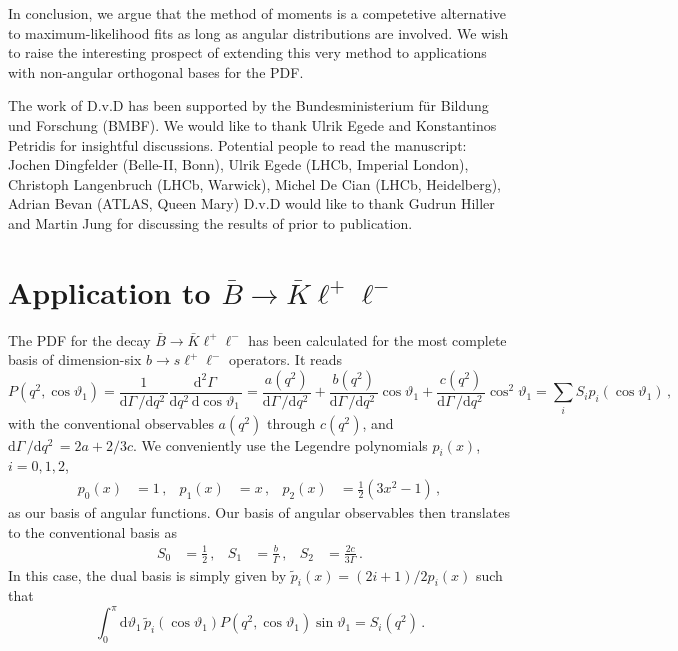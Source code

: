 \documentclass[aps,prd,reprint,nofootinbib,preprintnumbers]{revtex4}
\newcommand{\dual}[1]{\tilde{#1}}
\newcommand{\rmdx}[1]{\mbox{d} #1 \,} %
\renewcommand{\theta}{\vartheta}
\newcommand{\danny}[1]{{\color{purple}#1}}
\begin{document}
In conclusion, we argue that the method of moments is a competetive alternative to maximum-likelihood fits as long
as angular distributions are involved. We wish to raise the interesting prospect of extending this very method to
applications with non-angular orthogonal bases for the PDF.


\acknowledgments

The work of D.v.D has been supported by the Bundesministerium f\"ur Bildung und Forschung (BMBF).
We would like to thank Ulrik Egede and Konstantinos Petridis for insightful discussions.
\danny{Potential people to read the manuscript: Jochen Dingfelder (Belle-II, Bonn), Ulrik Egede (LHCb, Imperial London), Christoph Langenbruch (LHCb, Warwick), Michel De Cian (LHCb, Heidelberg), Adrian Bevan (ATLAS, Queen Mary)  }
D.v.D would like to thank Gudrun Hiller and Martin Jung for discussing the results of \cite{Das:2014sra} prior to publication.

\appendix

\section{Application to $\bar{B}\to\bar{K}\ell^+\ell^-$}
\label{app:btokll}

The PDF for the decay $\bar{B}\to\bar{K}\ell^+\ell^-$ has been calculated for the most
complete basis of dimension-six $b\to s \ell^+\ell^-$ operators. It reads \cite{Bobeth:2007dw,Bobeth:2012vn}
\begin{equation}
    P(q^2, \cos\theta_1)
        = \frac{1}{\rmdx{\Gamma}/\rmdx{q^2}} \frac{\rmdx{^2\Gamma}}{\rmdx{q^2} \rmdx{\cos\theta_1}}
        = \frac{a(q^2)}{\rmdx{\Gamma}/\rmdx{q^2}} + \frac{b(q^2)}{\rmdx{\Gamma}/\rmdx{q^2}} \cos\theta_1 + \frac{c(q^2)}{\rmdx{\Gamma}/\rmdx{q^2}} \cos^2\theta_1
        = \sum_i S_i p_i(\cos\theta_1)\,,
\end{equation}
with the conventional observables $a(q^2)$ through $c(q^2)$, and $\rmdx{\Gamma}/\rmdx{q^2} = 2a + 2/3 c$. We conveniently use the Legendre polynomials
$p_i(x)$, $i=0,1,2$,
\begin{equation}
\begin{aligned}
    p_0(x) & = 1\,, &
    p_1(x) & = x\,, &
    p_2(x) & = \frac{1}{2} (3x^2 - 1)\,,
\end{aligned}
\end{equation}
as our basis of angular functions. Our basis of angular observables then
translates to the conventional basis as
\begin{equation}
\begin{aligned}
    S_0 & = \frac{1}{2}\,, &
    S_1 & = \frac{b}{\Gamma}\,, &
    S_2 & = \frac{2c}{3\Gamma}\,.
\end{aligned}
\end{equation}
In this case, the dual basis is simply given by $\tilde{p}_i(x) = (2 i + 1)/2 p_i(x)$
such that
\begin{equation}
    \int_0^\pi \rmdx{\theta_1} \dual{p}_i(\cos\theta_1) P(q^2, \cos\theta_1)\sin\theta_1 = S_i(q^2)\,.
\end{equation}
\end{document}
